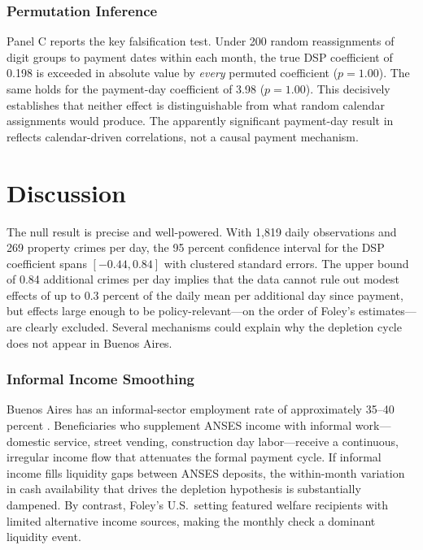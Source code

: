 \documentclass[12pt]{article}
\begin{document}
\subsubsection*{Permutation Inference} Panel C reports the key falsification test. Under 200 random reassignments of digit groups to payment dates within each month, the true DSP coefficient of 0.198 is exceeded in absolute value by \textit{every} permuted coefficient ($p = 1.00$). The same holds for the payment-day coefficient of 3.98 ($p = 1.00$). This decisively establishes that neither effect is distinguishable from what random calendar assignments would produce. The apparently significant payment-day result in  reflects calendar-driven correlations, not a causal payment mechanism.




\section{Discussion}
\label{sec:discussion}

The null result is precise and well-powered. With 1,819 daily observations and 269 property crimes per day, the 95 percent confidence interval for the DSP coefficient spans $[-0.44, 0.84]$ with clustered standard errors. The upper bound of 0.84 additional crimes per day implies that the data cannot rule out modest effects of up to 0.3 percent of the daily mean per additional day since payment, but effects large enough to be policy-relevant---on the order of Foley's estimates---are clearly excluded. Several mechanisms could explain why the \citet{foley2011} depletion cycle does not appear in Buenos Aires.

\subsubsection*{Informal Income Smoothing} Buenos Aires has an informal-sector employment rate of approximately 35--40 percent \citep{gasparini2009}. Beneficiaries who supplement ANSES income with informal work---domestic service, street vending, construction day labor---receive a continuous, irregular income flow that attenuates the formal payment cycle. If informal income fills liquidity gaps between ANSES deposits, the within-month variation in cash availability that drives the depletion hypothesis is substantially dampened. By contrast, Foley's U.S.\ setting featured welfare recipients with limited alternative income sources, making the monthly check a dominant liquidity event.
\end{document}
